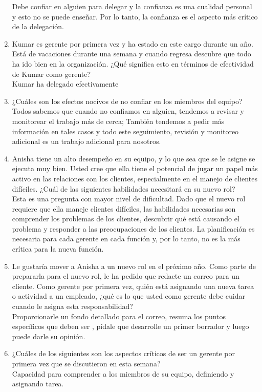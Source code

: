 \documentclass[10pt]{book}
\begin{document}
\begin{enumerate}[\bfseries 1.]
Debe confiar en alguien para delegar y la confianza es una cualidad personal y esto no se puede enseñar. Por lo tanto, la confianza es el aspecto más crítico de la delegación.
\item Kumar es gerente por primera vez y ha estado en este cargo durante un año. Está de vacaciones durante una semana y cuando regresa descubre que todo ha ido bien en la organización. ¿Qué significa esto en términos de efectividad de Kumar como gerente?\\
Kumar ha delegado efectivamente
\item ¿Cuáles son los efectos nocivos de no confiar en los miembros del equipo?\\
Todos sabemos que cuando no confiamos en alguien, tendemos a revisar y monitorear el trabajo más de cerca; También tendemos a pedir más información en tales casos y todo este seguimiento, revisión y monitoreo adicional es un trabajo adicional para nosotros.
\item Anisha tiene un alto desempeño en su equipo, y lo que sea que se le asigne se ejecuta muy bien. Usted cree que ella tiene el potencial de jugar un papel más activo en las relaciones con los clientes, especialmente en el manejo de clientes difíciles. ¿Cuál de las siguientes habilidades necesitará en su nuevo rol?\\
Esta es una pregunta con mayor nivel de dificultad. Dado que el nuevo rol requiere que ella maneje clientes difíciles, las habilidades necesarias son comprender los problemas de los clientes, descubrir qué está causando el problema y responder a las preocupaciones de los clientes. La planificación es necesaria para cada gerente en cada función y, por lo tanto, no es la más crítica para la nueva función.
\item Le gustaría mover a Anisha a un nuevo rol en el próximo año. Como parte de prepararla para el nuevo rol, le ha pedido que redacte un correo para un cliente. Como gerente por primera vez, quién está asignando una nueva tarea o actividad a un empleado, ¿qué es lo que usted como gerente debe cuidar cuando le asigna esta responsabilidad?\\
Proporcionarle un fondo detallado para el correo, resuma los puntos específicos que deben ser , pídale que desarrolle un primer borrador y luego puede darle su opinión.
\item ¿Cuáles de los siguientes son los aspectos críticos de ser un gerente por primera vez que se discutieron en esta semana?\\
Capacidad para comprender a los miembros de su equipo, definiendo y asignando tarea.
\end{enumerate}
\end{document}
